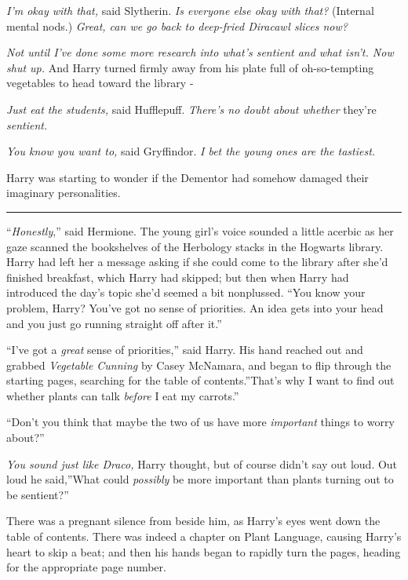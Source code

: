 \emph{I'm okay with that,} said Slytherin. \emph{Is everyone else okay
with that?} (Internal mental nods.) \emph{Great, can we go back to
deep-fried Diracawl slices now?}

\emph{Not until I've done some more research into what's sentient and
what isn't. Now shut up.} And Harry turned firmly away from his plate
full of oh-so-tempting vegetables to head toward the library -

\emph{Just eat the students,} said Hufflepuff. \emph{There's no doubt
about whether} they're \emph{sentient.}

\emph{You know you want to,} said Gryffindor. \emph{I bet the young ones
are the tastiest.}

Harry was starting to wonder if the Dementor had somehow damaged their
imaginary personalities.

\begin{center}\rule{3in}{0.4pt}\end{center}

``\emph{Honestly},'' said Hermione. The young girl's voice sounded a
little acerbic as her gaze scanned the bookshelves of the Herbology
stacks in the Hogwarts library. Harry had left her a message asking if
she could come to the library after she'd finished breakfast, which
Harry had skipped; but then when Harry had introduced the day's topic
she'd seemed a bit nonplussed. ``You know your problem, Harry? You've
got no sense of priorities. An idea gets into your head and you just go
running straight off after it.''

``I've got a \emph{great} sense of priorities,'' said Harry. His hand
reached out and grabbed \emph{Vegetable Cunning} by Casey McNamara, and
began to flip through the starting pages, searching for the table of
contents.''That's why I want to find out whether plants can talk
\emph{before} I eat my carrots.''

``Don't you think that maybe the two of us have more \emph{important}
things to worry about?''

\emph{You sound just like Draco,} Harry thought, but of course didn't
say out loud. Out loud he said,''What could \emph{possibly} be more
important than plants turning out to be sentient?''

There was a pregnant silence from beside him, as Harry's eyes went down
the table of contents. There was indeed a chapter on Plant Language,
causing Harry's heart to skip a beat; and then his hands began to
rapidly turn the pages, heading for the appropriate page number.

